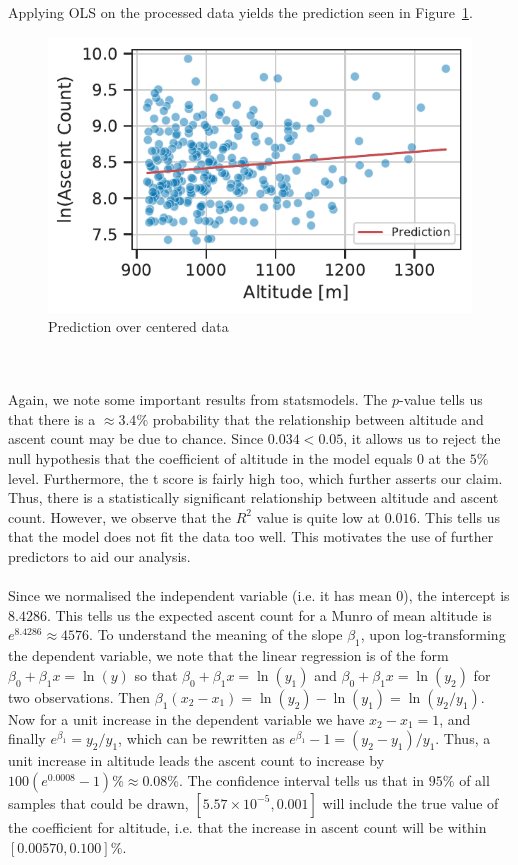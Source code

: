 \documentclass[11pt,a4paper]{article}
\begin{document}
Applying OLS on the processed data yields the prediction seen in Figure~\ref{fds-project-template:fig:q1_prediction}.
\begin{figure} [h!]
  \centering
  \includegraphics{report/q1_prediction.pdf}
  \caption{Prediction over centered data}
  \label{fds-project-template:fig:q1_prediction}
\end{figure} \\ \\
Again, we note some important results from statsmodels. The $p$-value tells us that there is a $\approx 3.4\%$ probability that the relationship between altitude and ascent count may be due to chance. Since $0.034 < 0.05$, it allows us to reject the null hypothesis that the coefficient of altitude in the model equals 0 at the $5\%$ level. Furthermore, the t score is fairly high too, which further asserts our claim. Thus, there is a statistically significant relationship between altitude and ascent count. However, we observe that the $R^{2}$ value is quite low at $0.016$. This tells us that the model does not fit the data too well. This motivates the use of further predictors to aid our analysis. \\ \\
Since we normalised the independent variable (i.e. it has mean 0), the intercept is $8.4286$. This tells us the expected ascent count for a Munro of mean altitude is $e^{8.4286}\approx 4576$. To understand the meaning of the slope $\beta_1$, upon log-transforming the dependent variable, we note that the linear regression is of the form $\beta_0 + \beta_1x = \ln(y)$ so that $\beta_0 + \beta_1x = \ln(y_1)$ and $\beta_0 + \beta_1x = \ln(y_2)$ for two observations. Then $\beta_1(x_2 - x_1) = \ln(y_2) - \ln(y_1) = \ln(y_2 / y_1)$. Now for a unit increase in the dependent variable we have $x_2 - x_1 = 1$, and finally $e^{\beta_1} = y_2 / y_1$, which can be rewritten as $e^{\beta_1} - 1 = (y_2 - y_1) / y_1$. Thus, a unit increase in altitude leads the ascent count to increase by $100(e^{0.0008} - 1)\% \approx 0.08\%$. The confidence interval tells us that in $95\%$ of all samples that could be drawn, $[5.57 \times 10^{-5}, 0.001]$ will include the true value of the coefficient for altitude, i.e. that the increase in ascent count will be within $[0.00570, 0.100]\%$.\\ \\
\end{document}
